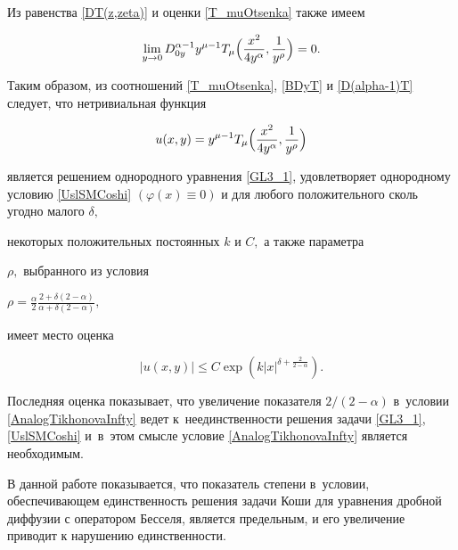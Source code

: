Из равенства \eqref{DT(z,zeta)} и оценки \eqref{T_muOtsenka} также имеем

\begin{equation} \label{D(alpha-1)T}  

\lim\limits_{y \rightarrow 0} D_{0y}^{\alpha-1} y^{\mu-1} T_{\mu}\Bigl(\frac{x^2}{4y^{\alpha}}, \frac{1}{y^{\rho}}\Bigr)=0.

\end{equation}   



Таким образом, из соотношений  \eqref{T_muOtsenka}, \eqref{BDyT} и \eqref{D(alpha-1)T} следует, что нетривиальная функция 

$$

u(x,y)=y^{\mu-1} T_{\mu}\Bigl(\frac{x^2}{4y^{\alpha}},\frac{1}{y^{\rho}}\Bigr)

$$

является решением однородного уравнения \eqref{GL3_1}, удовлетворяет однородному условию \eqref{UslSMCoshi} $(\varphi(x)\equiv 0)$ и для любого положительного сколь угодно малого $\delta,$ 

некоторых положительных постоянных $k$ и $C,$ а также параметра 

$\rho,$  выбранного из условия 

$\rho=\frac{\alpha}{2}\frac{2+\delta(2-\alpha)}{\alpha+\delta(2-\alpha)},$

имеет место оценка

$$

\left| u(x,y) \right|\leqslant C \exp\left(k |x|^{\delta+\frac{2}{2-\alpha}} \right).

$$



Последняя оценка показывает, что увеличение показателя  $2/(2-\alpha)$ в~условии \eqref{AnalogTikhonovaInfty} ведет к~неединственности решения задачи  \eqref{GL3_1},  \eqref{UslSMCoshi} и~в~этом смысле условие  \eqref{AnalogTikhonovaInfty} является необходимым.





\smallskip










В данной работе показывается, что показатель степени в~условии, обеспечивающем единственность решения задачи Коши для уравнения дробной диффузии с оператором Бесселя, является предельным, и его увеличение приводит к нарушению единственности. 



